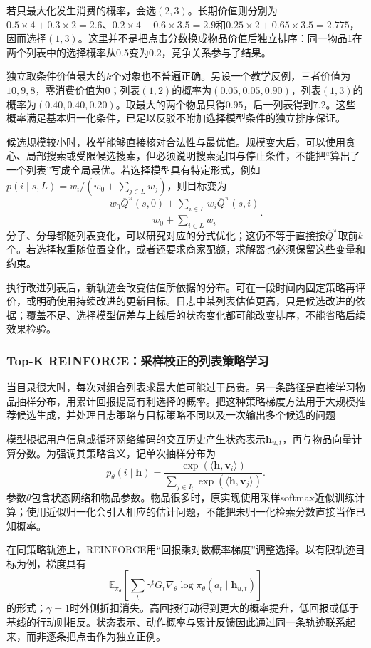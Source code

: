 若只最大化发生消费的概率，会选$(2,3)$。长期价值则分别为$0.5\times4+0.3\times2=2.6$、$0.2\times4+0.6\times3.5=2.9$和$0.25\times2+0.65\times3.5=2.775$，因而选择$(1,3)$。这里并不是把点击分数换成物品价值后独立排序：同一物品1在两个列表中的选择概率从0.5变为0.2，竞争关系参与了结果。

独立取条件价值最大的$k$个对象也不普遍正确。另设一个教学反例，三者价值为$10,9,8$，零消费价值为0；列表$(1,2)$的概率为$(0.05,0.05,0.90)$，列表$(1,3)$的概率为$(0.40,0.40,0.20)$。取最大的两个物品只得$0.95$，后一列表得到$7.2$。这些概率满足基本归一化条件，已足以反驳不附加选择模型条件的独立排序保证。

候选规模较小时，枚举能够直接核对合法性与最优值。规模变大后，可以使用贪心、局部搜索或受限候选搜索，但必须说明搜索范围与停止条件，不能把“算出了一个列表”写成全局最优。若选择模型具有特定形式，例如$p(i\mid s,L)=w_i/(w_0+\sum_{j\in L}w_j)$，则目标变为
\[
 \frac{w_0\overline Q^\pi(s,0)
       +\sum_{i\in L}w_i\overline Q^\pi(s,i)}
      {w_0+\sum_{i\in L}w_i}.
\]
分子、分母都随列表变化，可以研究对应的分式优化；这仍不等于直接按$\overline Q^\pi$取前$k$个。若选择权重随位置变化，或者还要求商家配额，求解器也必须保留这些变量和约束。

执行改进列表后，新轨迹会改变估值所依据的分布。可在一段时间内固定策略再评价，或明确使用持续改进的更新目标。日志中某列表估值更高，只是候选改进的依据；覆盖不足、选择模型偏差与上线后的状态变化都可能改变排序，不能省略后续效果检验。

\subsubsection{Top-K REINFORCE：采样校正的列表策略学习}
\label{sec:rs-topk-reinforce}

当目录很大时，每次对组合列表求最大值可能过于昂贵。另一条路径是直接学习物品抽样分布，用累计回报提高有利选择的概率。把这种策略梯度方法用于大规模推荐候选生成，并处理日志策略与目标策略不同以及一次输出多个候选的问题

模型根据用户信息或循环网络编码的交互历史产生状态表示$\bm{h}_{u,t}$，再与物品向量计算分数。为强调其策略含义，记单次抽样分布为
\[
 p_\theta(i\mid\bm{h})
 =\frac{\exp(\langle\bm{h},\bm{v}_i\rangle)}
        {\sum_{j\in I_t}\exp(\langle\bm{h},\bm{v}_j\rangle)}.
\]
参数$\theta$包含状态网络和物品参数。物品很多时，原实现使用采样softmax近似训练计算；使用近似归一化会引入相应的估计问题，不能把未归一化检索分数直接当作已知概率。

在同策略轨迹上，REINFORCE用“回报乘对数概率梯度”调整选择。以有限轨迹目标为例，梯度具有
\[
 \mathbb{E}_{\pi_\theta}
 \left[\sum_t\gamma^t G_t
       \nabla_\theta\log\pi_\theta(a_t\mid\bm{h}_{u,t})\right]
\]
的形式；$\gamma=1$时外侧折扣消失。高回报行动得到更大的概率提升，低回报或低于基线的行动则相反。状态表示、动作概率与累计反馈因此通过同一条轨迹联系起来，而非逐条把点击作为独立正例。

